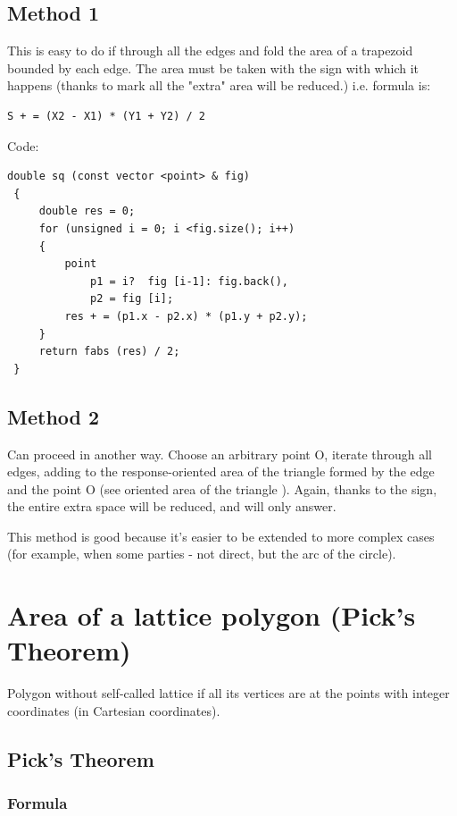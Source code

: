 \subsection{ Method 1 }
This is easy to do if through all the edges and fold the area of ​​a trapezoid bounded by each edge. The area must be taken with the sign with which it happens (thanks to mark all the "extra" area will be reduced.) i.e. formula is:

\begin{verbatim}
S + = (X2 - X1) * (Y1 + Y2) / 2 
\end{verbatim}
Code:

\begin{verbatim}
double sq (const vector <point> & fig)
 {
     double res = 0;
     for (unsigned i = 0; i <fig.size(); i++)
     {
         point
             p1 = i?  fig [i-1]: fig.back(),
             p2 = fig [i];
         res + = (p1.x - p2.x) * (p1.y + p2.y);
     }
     return fabs (res) / 2;
 } 
\end{verbatim}\subsection{ Method 2 }
Can proceed in another way. Choose an arbitrary point O, iterate through all edges, adding to the response-oriented area of the triangle formed by the edge and the point O (see oriented area of the triangle ). Again, thanks to the sign, the entire extra space will be reduced, and will only answer.

This method is good because it's easier to be extended to more complex cases (for example, when some parties - not direct, but the arc of the circle).

\section{ Area of ​​a lattice polygon (Pick's Theorem) }
Polygon without self-called lattice if all its vertices are at the points with integer coordinates (in Cartesian coordinates).

\subsection{ Pick's Theorem }

\subsubsection{ Formula }

